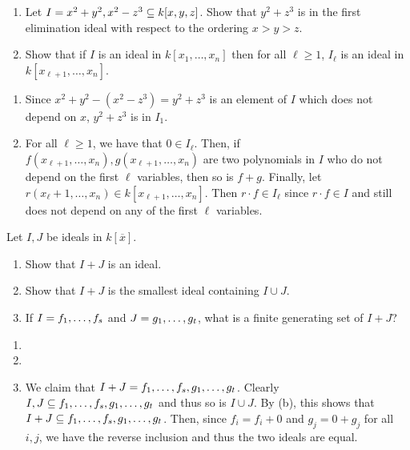 \documentclass[letterpaper, 11pt, oneside]{book}
\begin{document}
\clearpage

\begin{exercise}\label{ex:UAG_1.1.10}
  \begin{enumerate}[label= (\alph*)]
    \item Let $I = \ideal{x^{2} + y^{2}, x^{2} - z^{3}} \subseteq k[x, y, z]$.
          Show that $y^{2} + z^{3}$ is in the first elimination ideal with respect to the ordering $x > y > z$.
    \item Show that if $I$ is an ideal in $k[x_{1}, \ldots, x_{n}]$ then for all $\ell \geq 1$, $I_{\ell}$ is an ideal in $k[x_{\ell + 1}, \ldots, x_{n}]$.
  \end{enumerate}
\end{exercise}
\begin{pf}
  \begin{enumerate}[label= (\alph*)]
    \item Since $x^{2} + y^{2} - (x^{2} - z^{3}) = y^{2} + z^{3}$ is an element of $I$ which does not depend on $x$, $y^{2} + z^{3}$ is in $I_{1}$.
    \item For all $\ell \geq 1$, we have that $0 \in I_{\ell}$.
          Then, if $f(x_{\ell + 1}, \ldots, x_{n}), g(x_{\ell + 1}, \ldots, x_{n})$ are two polynomials in $I$ who do not depend on the first $\ell$ variables, then so is $f + g$.
          Finally, let $r(x_{\ell} + 1, \ldots, x_{n}) \in k[x_{\ell + 1}, \ldots, x_{n}]$.
          Then $r \cdot f \in I_{\ell}$ since $r \cdot f \in I$ and still does not depend on any of the first $\ell$ variables.
  \end{enumerate}
\end{pf}

\begin{exercise}\label{ex:UAG_1.1.11}
  Let $I, J$ be ideals in $k[\overline{x}]$.
  \begin{enumerate}[label= (\alph*)]
    \item Show that $I + J$ is an ideal.
    \item Show that $I + J$ is the smallest ideal containing $I \cup J$.
    \item If $I = \ideal{f_{1}, \ldots, f_{s}}$ and $J = \ideal{g_{1}, \ldots, g_{t}}$, what is a finite generating set of $I + J$?
  \end{enumerate}
\end{exercise}
\begin{pf}
  \begin{enumerate}[label= (\alph*)]
    \item {}
    \item {}
    \item We claim that $I + J = \ideal{f_{1}, \ldots, f_{s}, g_{1}, \ldots, g_{t}}$.
          Clearly $I, J \subseteq \ideal{f_{1}, \ldots, f_{s}, g_{1}, \ldots, g_{t}}$ and thus so is $I \cup J$.
          By (b), this shows that $I + J \subseteq \ideal{f_{1}, \ldots, f_{s}, g_{1}, \ldots, g_{t}}$.
          Then, since $f_{i} = f_{i} + 0$ and $g_{j} = 0 + g_{j}$ for all $i, j$, we have the reverse inclusion and thus the two ideals are equal.
  \end{enumerate}
\end{pf}
\end{document}
